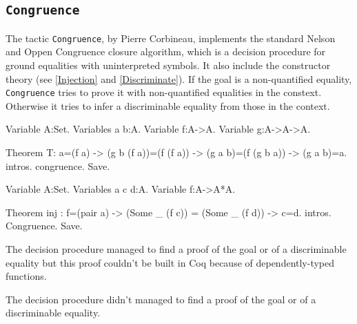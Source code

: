 
\subsection{\tt Congruence}
\label{Congruence}

The tactic {\tt Congruence}, by Pierre Corbineau, implements the standard Nelson and Oppen
Congruence closure algorithm, which is a decision procedure for ground
equalities with uninterpreted symbols. It also include the constructor theory
(see \ref{Injection} and \ref{Discriminate}).
If the goal is a non-quantified equality, {\tt Congruence} tries to
prove it with non-quantified equalities in the constext. Otherwise it
tries to infer a discriminable equality from those in the context.


\begin{coq_eval}
Variable A:Set.
Variables a b:A.
Variable f:A->A.
Variable g:A->A->A.
\end{coq_eval}

\begin{coq_example*}
Theorem T: a=(f a) -> (g b (f a))=(f (f a)) -> (g a b)=(f (g b a)) -> (g a b)=a.
intros.
congruence.
Save.
\end{coq_example*}

\begin{coq_eval}
Variable A:Set.
Variables a c d:A.
Variable f:A->A*A.
\end{coq_eval}

\begin{coq_example*}
Theorem inj : f=(pair a) -> (Some _ (f c)) = (Some _ (f d)) -> c=d.                             
intros.
Congruence.
Save.
\end{coq_example*}





\begin{ErrMsgs}
  \item {}
    The decision procedure managed to find a proof of the goal or of
    a discriminable equality but this proof couldn't be built in Coq
    because of dependently-typed functions.
  \item {}
    The decision procedure didn't managed to find a proof of the goal or of
    a discriminable equality.
\end{ErrMsgs}

